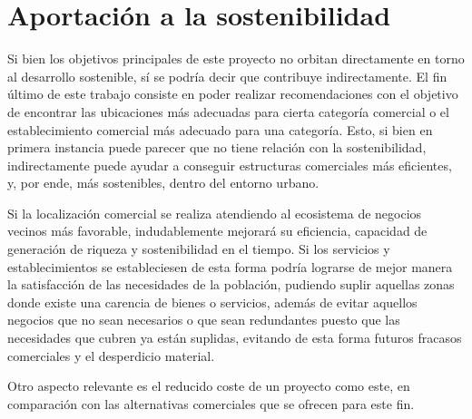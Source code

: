 

\section{Aportación a la sostenibilidad}

Si bien los objetivos principales de este proyecto no orbitan directamente en torno al desarrollo sostenible, sí se podría decir que contribuye indirectamente. El fin último de este trabajo consiste en poder realizar recomendaciones con el objetivo de encontrar las ubicaciones más adecuadas para cierta categoría comercial o el establecimiento comercial más adecuado para una categoría. Esto, si bien en primera instancia puede parecer que no tiene relación con la sostenibilidad, indirectamente puede ayudar a conseguir estructuras comerciales más eficientes, y, por ende, más sostenibles, dentro del entorno urbano.

Si la localización comercial se realiza atendiendo al ecosistema de negocios vecinos más favorable, indudablemente mejorará su eficiencia, capacidad de generación de riqueza y sostenibilidad en el tiempo. Si los servicios y establecimientos se estableciesen de esta forma podría lograrse de mejor manera la satisfacción de las necesidades de la población, pudiendo suplir aquellas zonas donde existe una carencia de bienes o servicios, además de evitar aquellos negocios que no sean necesarios o que sean redundantes puesto que las necesidades que cubren ya están suplidas, evitando de esta forma futuros fracasos comerciales y el desperdicio material.

Otro aspecto relevante es el reducido coste de un proyecto como este, en comparación con las alternativas comerciales que se ofrecen para este fin.
